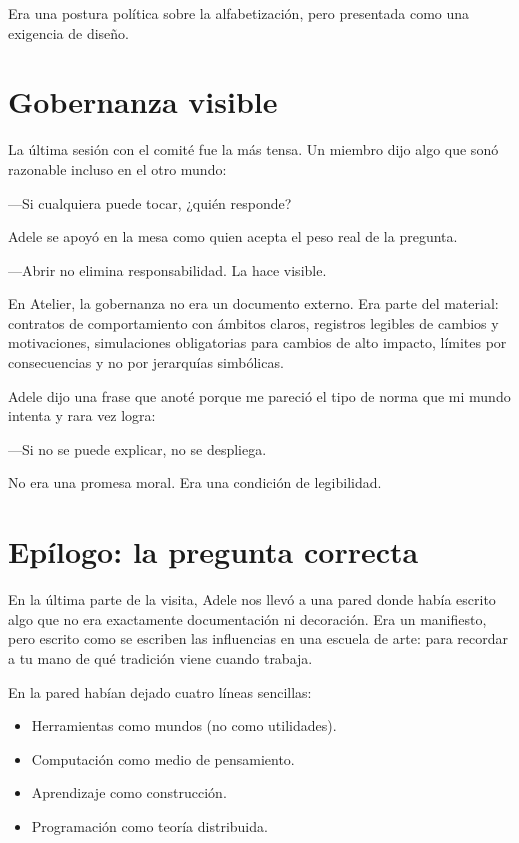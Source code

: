 \documentclass[11pt,a4paper]{article}
\begin{document}
Era una postura política sobre la alfabetización, pero presentada como una
exigencia de diseño.

\section{Gobernanza visible}

La última sesión con el comité fue la más tensa. Un miembro dijo algo que sonó
razonable incluso en el otro mundo:

---Si cualquiera puede tocar, ¿quién responde?

Adele se apoyó en la mesa como quien acepta el peso real de la pregunta.

---Abrir no elimina responsabilidad. La hace visible.

En Atelier, la gobernanza no era un documento externo. Era parte del material:
contratos de comportamiento con ámbitos claros, registros legibles de cambios
y motivaciones, simulaciones obligatorias para cambios de alto impacto,
límites por consecuencias y no por jerarquías simbólicas.

Adele dijo una frase que anoté porque me pareció el tipo de norma que mi mundo
intenta y rara vez logra:

---Si no se puede explicar, no se despliega.

No era una promesa moral. Era una condición de legibilidad.

\section{Epílogo: la pregunta correcta}

En la última parte de la visita, Adele nos llevó a una pared donde había
escrito algo que no era exactamente documentación ni decoración. Era un
manifiesto, pero escrito como se escriben las influencias en una escuela de
arte: para recordar a tu mano de qué tradición viene cuando trabaja.

En la pared habían dejado cuatro líneas sencillas:

\begin{itemize}
  \item Herramientas como mundos (no como utilidades).
  \item Computación como medio de pensamiento.
  \item Aprendizaje como construcción.
  \item Programación como teoría distribuida.
\end{itemize}
\end{document}
